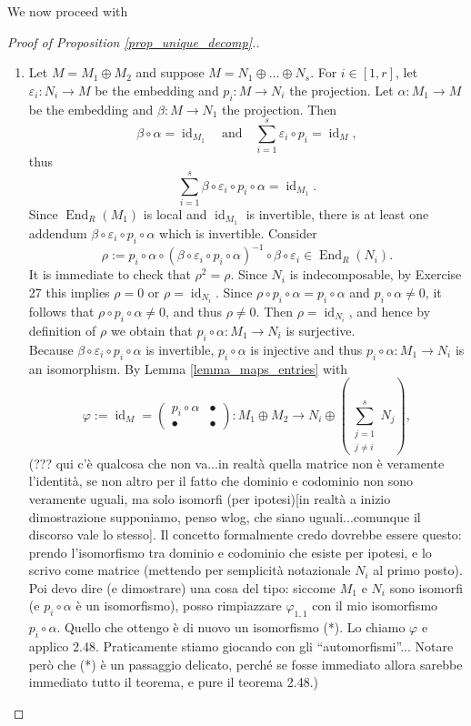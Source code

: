 \documentclass[12pt,a4paper]{report}
\theoremstyle{definition}
\theoremstyle{num.custom-title}
\DeclareMathOperator{\id}{id}
\DeclareMathOperator{\End}{End}
\renewcommand{\epsilon}{\varepsilon}
\renewcommand{\phi}{\varphi}
\begin{document}
We now proceed with
\begin{proof}[Proof of Proposition \ref{prop_unique_decomp}.]\ 
\begin{enumerate}
\item Let $M = M_1 \oplus M_2$ and suppose $M = N_1 \oplus \ldots \oplus N_s$. For $i \in [1,r]$, let $\epsilon_i : N_i \to M$ be the embedding and $p_i : M \to N_i$ the projection. Let $\alpha : M_1 \to M$ be the embedding and $\beta : M \to N_1$ the projection. Then
\[
\beta \circ \alpha = \id_{M_1} \quad \text{and} \quad \sum_{i=1}^s \epsilon_i \circ p_i = \id_M,
\]
thus
\[
\sum_{i=1}^s \beta \circ \epsilon_i \circ p_i \circ \alpha = \id_{M_1}.
\]
Since $\End_R(M_1)$ is local and $\id_{M_1}$ is invertible, there is at least one addendum $\beta \circ \epsilon_i \circ p_i \circ \alpha$ which is invertible. Consider
\[
\rho := p_i \circ \alpha \circ (\beta \circ \epsilon_i \circ p_i \circ \alpha)^{-1} \circ \beta \circ \epsilon_i \in \End_R(N_i).
\]
It is immediate to check that $\rho^2=\rho$. Since $N_i$ is indecomposable, by Exercise 27 this implies $\rho=0$ or $\rho=\id_{N_i}$. Since $\rho \circ p_i \circ \alpha = p_i \circ \alpha$ and $p_i \circ \alpha \neq 0$, it follows that $\rho \circ p_i \circ \alpha \neq 0$, and thus $\rho \neq 0$. Then $\rho=\id_{N_i}$, and hence by definition of $\rho$ we obtain that $p_i \circ \alpha : M_1 \to N_i$ is surjective.\\
Because $\beta \circ \epsilon_i \circ p_i \circ \alpha$ is invertible, $p_i \circ \alpha$ is injective and thus $p_i \circ \alpha : M_1 \to N_i$ is an isomorphism. By Lemma \ref{lemma_maps_entries} with
\[
\phi := \id_M =
\begin{pmatrix}
p_i \circ \alpha & \bullet \\
\bullet & \bullet
\end{pmatrix}
\colon M_1 \oplus M_2 \to N_i \oplus \left( \sum_{\substack{j=1 \\ j \neq i}}^s N_j \right),
\]
(??? qui c'è qualcosa che non va...in realtà quella matrice non è veramente l'identità, se non altro per il fatto che dominio e codominio non sono veramente uguali, ma solo isomorfi (per ipotesi)[in realtà a inizio dimostrazione supponiamo, penso wlog, che siano uguali...comunque il discorso vale lo stesso]. Il concetto formalmente credo dovrebbe essere questo: prendo l'isomorfismo tra dominio e codominio che esiste per ipotesi, e lo scrivo come matrice (mettendo per semplicità notazionale $N_i$ al primo posto). Poi devo dire (e dimostrare) una cosa del tipo: siccome $M_1$ e $N_i$ sono isomorfi (e $p_i \circ \alpha$ è un isomorfismo), posso rimpiazzare $\phi_{1,1}$ con il mio isomorfismo $p_i \circ \alpha$. Quello che ottengo è di nuovo un isomorfismo (*). Lo chiamo $\phi$ e applico 2.48. Praticamente stiamo giocando con gli ``automorfismi''... Notare però che (*) è un passaggio delicato, perché se fosse immediato allora sarebbe immediato tutto il teorema, e pure il teorema 2.48.)\\

\end{enumerate}
\end{proof}
\end{document}

